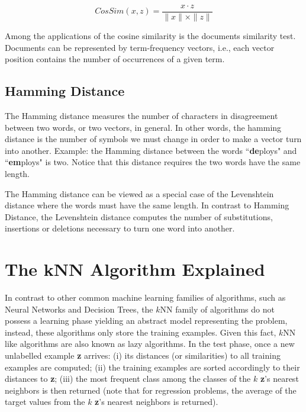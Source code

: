 \begin{equation}
    CosSim(x,z) = \frac{x \cdot z}{\|x\| \times \|z\|}
    \label{eq:cosineSim}
\end{equation}

Among the applications of the cosine similarity is the documents similarity test. Documents can be represented by term-frequency vectors, i.e., each vector position contains the number of occurrences of a given term. 


\subsection{Hamming Distance}

The Hamming distance \cite{hamming:12} measures the number of characters in disagreement between two words, or two vectors, in general. In other words, the hamming distance is the number of symbols we must change in order to make a vector turn into another. Example: the Hamming distance between the words ``\textbf{de}ploys" and ``\textbf{em}ploys" is two. Notice that this distance requires the two words have the same length. 

The Hamming distance can be viewed as a special case of the Levenshtein distance where the words must have the same length. In contrast to Hamming Distance, the Levenshtein distance computes the number of substitutions, insertions or deletions necessary to turn one word into another.


\section{The kNN Algorithm Explained}

In contrast to other common machine learning families of algorithms, such as Neural Networks and Decision Trees, the $k$NN family of algorithms do not possess a learning phase yielding an abstract model representing the problem, instead, these algorithms only store the training examples. Given this fact, $k$NN like algorithms are also known as lazy algorithms. In the test phase, once a new unlabelled example \textbf{z} arrives: (i) its distances (or similarities) to all training examples are computed; (ii) the training examples are sorted accordingly to their distances to \textbf{z}; (iii) the most frequent class among the classes of the $k$ \textbf{z}'s nearest neighbors is then returned (note that for regression problems, the average of the target values from the $k$ \textbf{z}'s nearest neighbors is returned). 

